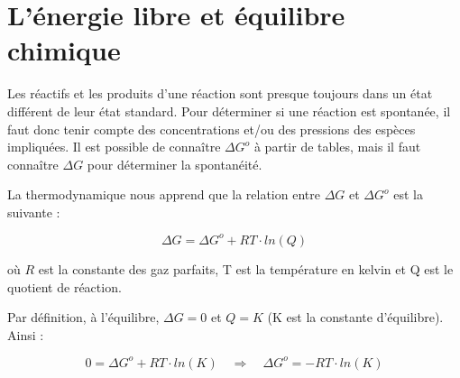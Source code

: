 \documentclass[
  11pt,
  a4paper,
  openany]{book}
\begin{document}
\clearpage

\hypertarget{luxe9nergie-libre-et-uxe9quilibre-chimique}{%
\section{L'énergie libre et équilibre chimique}\label{luxe9nergie-libre-et-uxe9quilibre-chimique}}

Les réactifs et les produits d'une réaction sont presque toujours dans un état différent de leur état standard. Pour déterminer si une réaction est spontanée, il faut donc tenir compte des concentrations et/ou des pressions des espèces impliquées. Il est possible de connaître \(\Delta G^o\) à partir de tables, mais il faut connaître \(\Delta G\) pour déterminer la spontanéité.

La thermodynamique nous apprend que la relation entre \(\Delta G\) et \(\Delta G^o\) est la suivante :

\[
\Delta G = \Delta G^o + RT \cdot ln(Q)
\]

où \(R\) est la constante des gaz parfaits, T est la température en kelvin et Q est le quotient de réaction.

Par définition, à l'équilibre, \(\Delta G = 0\) et \(Q = K\) (K est la constante d'équilibre). Ainsi :

\[
0 = \Delta G^o + RT \cdot ln(K) \quad \Rightarrow \quad \Delta G^o = - RT \cdot ln(K)
\]
\end{document}

